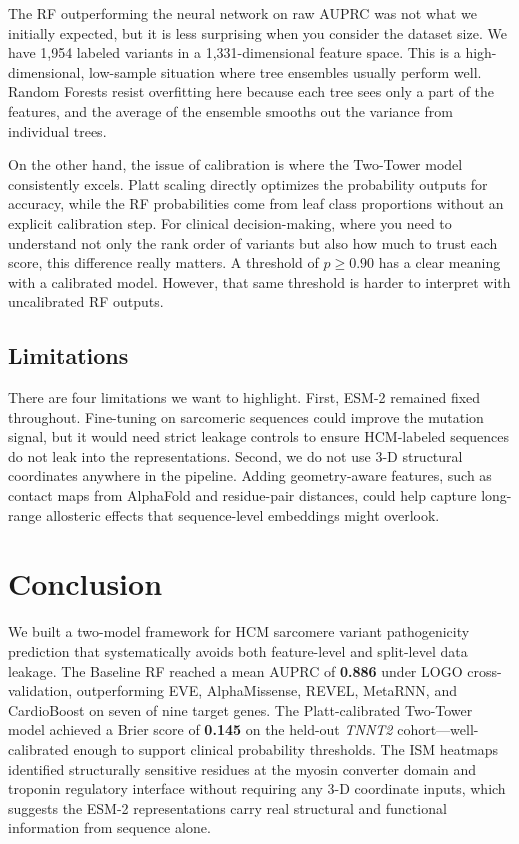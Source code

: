 \documentclass[conference]{IEEEtran}
\begin{document}
The RF outperforming the neural network on raw AUPRC was not what we initially expected, but it is less surprising when you consider the dataset size. We have 1,954 labeled variants in a 1,331-dimensional feature space. This is a high-dimensional, low-sample situation where tree ensembles usually perform well. Random Forests resist overfitting here because each tree sees only a part of the features, and the average of the ensemble smooths out the variance from individual trees. 

On the other hand, the issue of calibration is where the Two-Tower model consistently excels. Platt scaling directly optimizes the probability outputs for accuracy, while the RF probabilities come from leaf class proportions without an explicit calibration step. For clinical decision-making, where you need to understand not only the rank order of variants but also how much to trust each score, this difference really matters. A threshold of $\hat{p} \geq 0.90$ has a clear meaning with a calibrated model. However, that same threshold is harder to interpret with uncalibrated RF outputs.

\subsection{Limitations}


There are four limitations we want to highlight. First, ESM-2 remained fixed throughout. Fine-tuning on sarcomeric sequences could improve the mutation signal, but it would need strict leakage controls to ensure HCM-labeled sequences do not leak into the representations. Second, we do not use 3-D structural coordinates anywhere in the pipeline. Adding geometry-aware features, such as contact maps from AlphaFold and residue-pair distances, could help capture long-range allosteric effects that sequence-level embeddings might overlook.




\section{Conclusion}
\label{sec:conclusion}

We built a two-model framework for HCM sarcomere variant pathogenicity prediction that systematically avoids both feature-level and split-level data leakage. The Baseline RF reached a mean AUPRC of \textbf{0.886} under LOGO cross-validation, outperforming EVE, AlphaMissense, REVEL, MetaRNN, and CardioBoost on seven of nine target genes. The Platt-calibrated Two-Tower model achieved a Brier score of \textbf{0.145} on the held-out \textit{TNNT2} cohort---well-calibrated enough to support clinical probability thresholds. The ISM heatmaps identified structurally sensitive residues at the myosin converter domain and troponin regulatory interface without requiring any 3-D coordinate inputs, which suggests the ESM-2 representations carry real structural and functional information from sequence alone.
\end{document}
